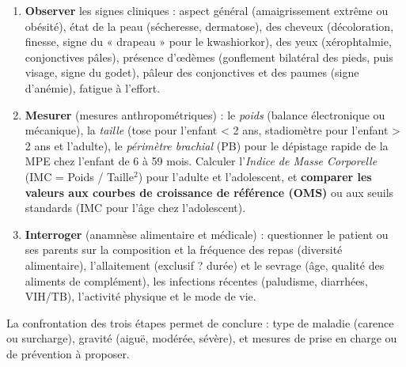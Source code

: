 \documentclass[11pt]{article}
\begin{document}
\begin{methode}
\begin{enumerate}
  \item \textbf{Observer} les signes cliniques : aspect général (amaigrissement extrême ou obésité), état de la peau (sécheresse, dermatose), des cheveux (décoloration, finesse, signe du « drapeau » pour le kwashiorkor), des yeux (xérophtalmie, conjonctives pâles), présence d'œdèmes (gonflement bilatéral des pieds, puis visage, signe du godet), pâleur des conjonctives et des paumes (signe d'anémie), fatigue à l'effort.
  \item \textbf{Mesurer} (mesures anthropométriques) : le \emph{poids} (balance électronique ou mécanique), la \emph{taille} (tose pour l'enfant < 2 ans, stadiomètre pour l'enfant > 2 ans et l'adulte), le \emph{périmètre brachial} (PB) pour le dépistage rapide de la MPE chez l'enfant de 6 à 59 mois. Calculer l'\emph{Indice de Masse Corporelle} (IMC = Poids / Taille$^2$) pour l'adulte et l'adolescent, et \textbf{comparer les valeurs aux courbes de croissance de référence (OMS)} ou aux seuils standards (IMC pour l'âge chez l'adolescent).
  \item \textbf{Interroger} (anamnèse alimentaire et médicale) : questionner le patient ou ses parents sur la composition et la fréquence des repas (diversité alimentaire), l'allaitement (exclusif ? durée) et le sevrage (âge, qualité des aliments de complément), les infections récentes (paludisme, diarrhées, VIH/TB), l'activité physique et le mode de vie.
\end{enumerate}
La confrontation des trois étapes permet de conclure : type de maladie (carence ou surcharge), gravité (aiguë, modérée, sévère), et mesures de prise en charge ou de prévention à proposer.
\end{methode}
\end{document}
